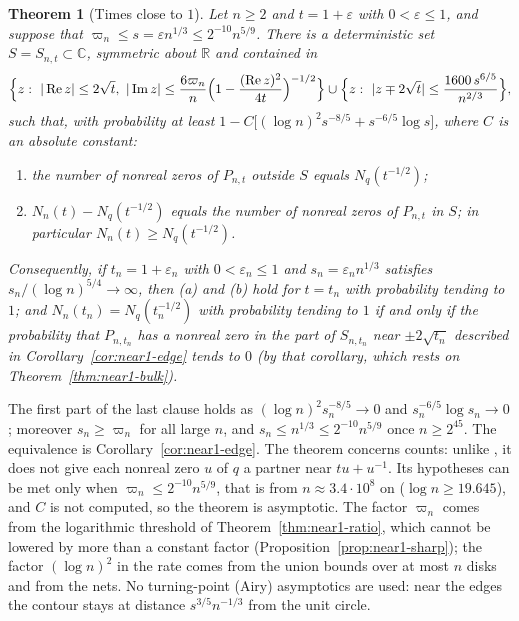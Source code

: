 \documentclass[11pt]{amsart}
\newtheorem{theorem}{Theorem}[section]
\theoremstyle{definition}
\theoremstyle{remark}
\numberwithin{equation}{section}
\newcommand{\C}{\mathbb{C}}
\newcommand{\R}{\mathbb{R}}
\newcommand{\eps}{\varepsilon}
\DeclareMathOperator{\re}{Re}
\DeclareMathOperator{\im}{Im}
\begin{document}
\begin{theorem}[Times close to $1$]\label{thm:window}
Let $n\ge2$ and $t=1+\eps$ with $0<\eps\le1$, and suppose that $\varpi_n\le s=\eps n^{1/3}\le2^{-10}n^{5/9}$. There is a deterministic set $S=S_{n,t}\subset\C$, symmetric about $\R$ and contained in
\[
\Bigl\{z:\ |\re z|\le2\sqrt t,\ |\im z|\le\frac{6\varpi_n}{n}\Bigl(1-\frac{(\re z)^2}{4t}\Bigr)^{-1/2}\Bigr\}\cup\Bigl\{z:\ |z\mp2\sqrt t|\le\frac{1600\,s^{6/5}}{n^{2/3}}\Bigr\},
\]
such that, with probability at least $1-C\bigl[(\log n)^2s^{-8/5}+s^{-6/5}\log s\bigr]$, where $C$ is an absolute constant:
\begin{enumerate}
\item[(a)] the number of nonreal zeros of $P_{n,t}$ outside $S$ equals $N_q(t^{-1/2})$;
\item[(b)] $N_n(t)-N_q(t^{-1/2})$ equals the number of nonreal zeros of $P_{n,t}$ in $S$; in particular $N_n(t)\ge N_q(t^{-1/2})$.
\end{enumerate}
Consequently, if $t_n=1+\eps_n$ with $0<\eps_n\le1$ and $s_n=\eps_nn^{1/3}$ satisfies $s_n/(\log n)^{5/4}\to\infty$, then (a) and (b) hold for $t=t_n$ with probability tending to $1$; and $N_n(t_n)=N_q(t_n^{-1/2})$ with probability tending to $1$ if and only if the probability that $P_{n,t_n}$ has a nonreal zero in the part of $S_{n,t_n}$ near $\pm2\sqrt{t_n}$ described in Corollary~\ref{cor:near1-edge} tends to $0$ (by that corollary, which rests on Theorem~\ref{thm:near1-bulk}).
\end{theorem}

The first part of the last clause holds as $(\log n)^2s_n^{-8/5}\to0$ and $s_n^{-6/5}\log s_n\to0$; moreover $s_n\ge\varpi_n$ for all large $n$, and $s_n\le n^{1/3}\le2^{-10}n^{5/9}$ once $n\ge2^{45}$. The equivalence is Corollary~\ref{cor:near1-edge}. The theorem concerns counts: unlike \cite[Theorem~\ref{M-thm:heat}]{Main}, it does not give each nonreal zero $u$ of $q$ a partner near $tu+u^{-1}$. Its hypotheses can be met only when $\varpi_n\le2^{-10}n^{5/9}$, that is from $n\approx3.4\cdot10^8$ on ($\log n\ge19.645$), and $C$ is not computed, so the theorem is asymptotic. The factor $\varpi_n$ comes from the logarithmic threshold of Theorem~\ref{thm:near1-ratio}, which cannot be lowered by more than a constant factor (Proposition~\ref{prop:near1-sharp}); the factor $(\log n)^2$ in the rate comes from the union bounds over at most $n$ disks and from the nets. No turning-point (Airy) asymptotics are used: near the edges the contour stays at distance $s^{3/5}n^{-1/3}$ from the unit circle.
\end{document}
